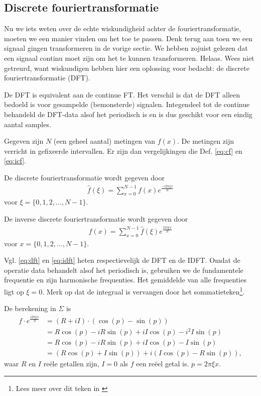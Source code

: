 \documentclass[11pt,fleqn]{book} %
\begin{document}
\subsection{Discrete fouriertransformatie}
Nu we iets weten over de echte wiskundigheid achter de fouriertransformatie, moeten we een manier vinden om het toe te passen. Denk terug aan toen we een signaal gingen transformeren in de vorige sectie. We hebben zojuist gelezen dat een signaal continu moet zijn om het te kunnen transformeren. Helaas. Wees niet getreurd, want wiskundigen hebben hier een oplossing voor bedacht: de discrete fouriertransformatie (DFT).

De DFT is equivalent aan de continue FT. Het verschil is dat de DFT alleen bedoeld is voor gesampelde (bemonsterde) signalen. Integendeel tot de continue behandeld de DFT-data alsof het periodisch is en is dus geschikt voor een eindig aantal samples.

Gegeven zijn $N$ (een geheel aantal) metingen van $f(x)$. De metingen zijn verricht in gefixeerde intervallen. Er zijn dan vergelijkingen die Def. \ref{eq:cf} en \ref{eq:icf}.
\begin{definition} \label{eq:dft}
De discrete fouriertransformatie wordt gegeven door
\begin{align}
\hat{f}(\xi)=\sum_{x=0}^{N-1} f(x)e^{\frac{-i2\pi \xi x}{N}}
\end{align}
voor $\xi=\{0, 1, 2, \ldots, N-1\}$.
\end{definition}
\begin{definition} \label{eq:idft}
De inverse discrete fouriertransformatie wordt gegeven door
\begin{align}
f(x)=\sum_{x=0}^{N-1} \hat{f}(\xi)e^{\frac{i2\pi \xi x}{N}}
\end{align}
voor $x=\{0, 1, 2, \ldots, N-1\}$.
\end{definition}


Vgl. \ref{eq:dft} en \ref{eq:idft} heten respectievelijk de DFT en de IDFT. Omdat de operatie data behandelt alsof het periodisch is, gebruiken we de fundamentele frequentie en zijn harmonische frequenties. Het gemiddelde van alle frequenties ligt op $\xi=0$. Merk op dat de integraal is vervangen door het sommatieteken\footnote{Lees meer over dit teken in \cite{som}}.

De berekening in $\Sigma$ is
\begin{displaymath}
\begin{aligned}
f\cdot e^{\frac{i2\pi \xi x}{N}}&=(R+iI)\cdot(\cos{(p)}-\sin{(p)})\\
& = R\cos{(p)}-iR\sin{(p)}+iI\cos{(p)}-i^2I\sin{(p)}\\
& =R\cos{(p)}-iR\sin{(p)}+iI\cos{(p)}-I\sin{(p)}\\
& =(R\cos{(p)}+I\sin{(p)})+i(I\cos{(p)}-R\sin{(p)}),
\end{aligned}
\end{displaymath}
waar $R$ en $I$ reële getallen zijn, $I=0$ als $f$ een reëel getal is. $p=2\pi\xi x$.
\end{document}
